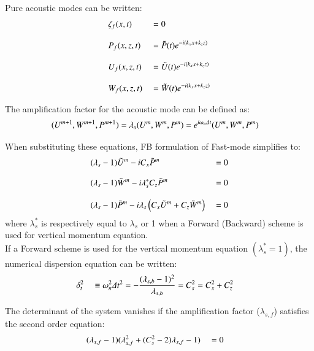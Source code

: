 \documentclass[a4paper,11pt]{article}
\begin{document}
Pure acoustic modes can be written:
\begin{equation}
   \begin{split}
    \displaystyle
     &\zeta_f(x,t)&&=0\\[3mm]
     &P_f(x,z,t)  &&=\tilde{P}(t) e^{-i(k_x x+k_z z)}\\[3mm]
     &U_f(x,z,t)  &&=\tilde{U}(t) e^{-i(k_x x+k_z z)}\\[3mm]
     &W_f(x,z,t)  &&=\tilde{W}(t) e^{-i(k_x x+k_z z)}
   \end{split}
\end{equation}

The amplification factor for the acoustic mode can be defined as:
\begin{equation}
   \begin{split}
    \displaystyle
    &(U^{m+1},W^{m+1},P^{m+1})=\lambda_s (U^{m},W^{m},P^{m})=e^{i\omega_n\Delta t}(U^{m},W^{m},P^{m})
   \end{split}
\end{equation}

When substituting these equations, FB formulation of Fast-mode simplifies to:
\begin{equation}
   \begin{split}
    \displaystyle
    &(\lambda_s-1)\tilde{U}^m - i C_x \tilde{P}^m &&=0\\[3mm]
    \displaystyle
    &(\lambda_s-1)\tilde{W}^m - i\lambda_s^* C_z \tilde{P}^m &&=0\\[3mm]
    \displaystyle
    &(\lambda_s-1)\tilde{P}^m - i\lambda_s\left(
          C_x \tilde{U}^{m}+ C_z \tilde{W}^{m}\right)&&=0
   \end{split}
   \label{acousFB2}
\end{equation}
where $\lambda_s^*$ is respectively equal to $\lambda_s$ or 1 when a Forward (Backward) scheme is used for vertical 
momentum equation.\\

If a Forward scheme is used for the vertical momentum equation $(\lambda_s^*=1)$, the numerical dispersion equation 
can  be written:
\begin{equation}
   \begin{split}
    \displaystyle   
     &\delta_t^2 &&\equiv \omega_n^2 \Delta t^2 =-\frac{(\lambda_{s,b}-1)^2}{\lambda_{s,b}} = C_{s}^2 = C_{x}^2+C_{z}^2
   \end{split}
\end{equation}

The determinant of the system vanishes if the amplification factor ($\lambda_{s,f}$) satisfies the second order equation:
\begin{equation}
   \begin{split}
    \displaystyle
    &(\lambda_{s,f}-1)(\lambda_{s,f}^2+(C_s^2-2)\lambda_{s,f}-1)&&=0 
   \end{split}
\end{equation}
\end{document}

